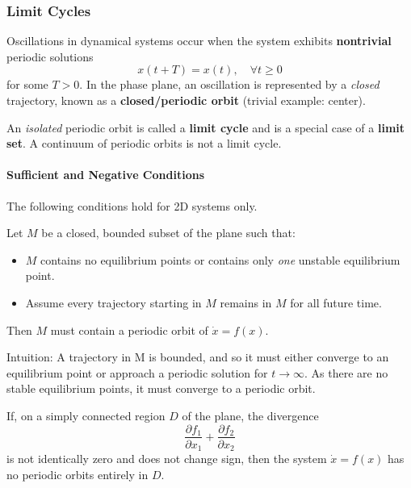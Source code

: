 \subsubsection{Limit Cycles}

Oscillations in dynamical systems occur when the system exhibits \textbf{nontrivial} periodic solutions
\noindent\begin{equation*}
    x (t+ T ) = x (t), \quad \forall t \geq 0
\end{equation*}
for some $T > 0$. In the phase plane, an oscillation is represented by a \textit{closed} trajectory, known as a \textbf{closed/periodic orbit} (trivial example: center).

An \textit{isolated} periodic orbit is called a \textbf{limit cycle} and is a special case of a \textbf{limit set}. A continuum of periodic orbits is not a limit cycle.

\paragraph{Sufficient and Negative Conditions}
The following conditions hold for 2D systems only.

\newpar{}

Let $M$ be a closed, bounded subset of the plane such that:
\begin{itemize}
    \item $M$ contains no equilibrium points or contains only \textit{one} unstable equilibrium point.
    \item Assume every trajectory starting in $M$ remains in $M$ for all future time.
\end{itemize}
Then $M$ must contain a periodic orbit of $\dot{x} = f(x)$.

Intuition: A trajectory in M is bounded, and so it must either converge to an equilibrium point or approach a periodic solution for $t\rightarrow \infty$. As there are no stable equilibrium points, it must converge to a periodic orbit.

\newpar{}

If, on a simply connected region $D$ of the plane, the divergence
\noindent\begin{equation*}
    \frac{\partial f_1}{\partial x_1} + \frac{\partial f_2}{\partial x_2}
\end{equation*}
is not identically zero and does not change sign, then the system $\dot{x} = f (x)$ has no periodic orbits entirely in $D$.

